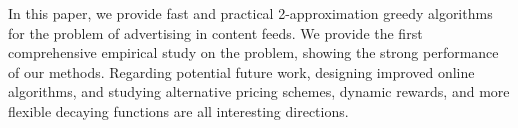 In this paper, we provide fast and practical 2-approximation greedy algorithms for the problem of advertising in content feeds.
We provide the first comprehensive empirical study on the problem, showing the strong performance of our methods. %
Regarding potential future work,
designing improved online algorithms, 
and studying alternative pricing schemes, dynamic rewards, and more flexible decaying functions 
are all interesting directions.
